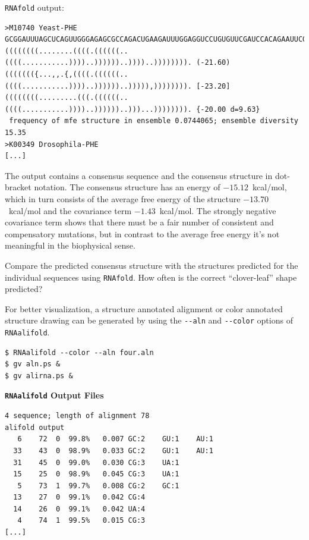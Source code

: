 \documentclass[]{article}
\begin{document}
\texttt{RNAfold} output:

\begin{verbatim}
>M10740 Yeast-PHE
GCGGAUUUAGCUCAGUUGGGAGAGCGCCAGACUGAAGAUUUGGAGGUCCUGUGUUCGAUCCACAGAAUUCGCA
((((((((........((((.((((((..((((...........))))..))))))..))))..)))))))). (-21.60)
((((((({...,,.{,((((.((((((..((((...........))))..))))))..))))),)))))))). [-23.20]
((((((((.........(((.((((((..((((...........))))..))))))..)))...)))))))). {-20.00 d=9.63}
 frequency of mfe structure in ensemble 0.0744065; ensemble diversity 15.35
>K00349 Drosophila-PHE
[...]
\end{verbatim}

The output contains a consensus sequence and the consensus structure in
dot-bracket notation. The consensus structure has an energy of
\(- 15.12\)~kcal/mol, which in turn consists of the average free energy
of the structure \(- 13.70\)~kcal/mol and the covariance term
\(- 1.43\)~kcal/mol. The strongly negative covariance term shows that
there must be a fair number of consistent and compensatory mutations,
but in contrast to the average free energy it's not meaningful in the
biophysical sense.

Compare the predicted consensus structure with the structures predicted
for the individual sequences using \texttt{RNAfold}. How often is the
correct ``clover-leaf'' shape predicted?

For better visualization, a structure annotated alignment or color
annotated structure drawing can be generated by using the
\texttt{-\/-aln} and \texttt{-\/-color} options of \texttt{RNAalifold}.

\begin{verbatim}
$ RNAalifold --color --aln four.aln
$ gv aln.ps &
$ gv alirna.ps &
\end{verbatim}

\textbf{\texttt{RNAalifold} Output Files}\\

\begin{verbatim}
4 sequence; length of alignment 78
alifold output
   6    72  0  99.8%   0.007 GC:2    GU:1    AU:1
  33    43  0  98.9%   0.033 GC:2    GU:1    AU:1
  31    45  0  99.0%   0.030 CG:3    UA:1
  15    25  0  98.9%   0.045 CG:3    UA:1
   5    73  1  99.7%   0.008 CG:2    GC:1
  13    27  0  99.1%   0.042 CG:4
  14    26  0  99.1%   0.042 UA:4
   4    74  1  99.5%   0.015 CG:3
[...]
\end{verbatim}
\end{document}
